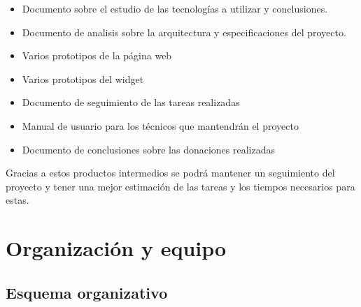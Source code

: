 \begin{itemize}
	\item Documento sobre el estudio de las tecnologías a utilizar y conclusiones.
	\item Documento de analisis sobre la arquitectura y especificaciones del proyecto.
	\item Varios prototipos de la página web
	\item Varios prototipos del widget
	\item Documento de seguimiento de las tareas realizadas
	\item Manual de usuario para los técnicos que mantendrán el proyecto
	\item Documento de conclusiones sobre las donaciones realizadas
\end{itemize}

Gracias a estos productos intermedios se podrá mantener un seguimiento del proyecto y tener una mejor estimación de las tareas y los tiempos necesarios para estas.

\section{Organización y equipo}

\subsection{Esquema organizativo}


